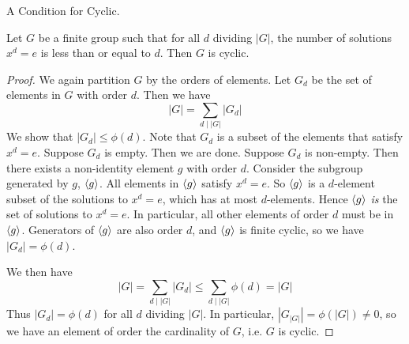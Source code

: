 \documentclass[../../book.tex]{subfiles}
\begin{document}
\begin{thm} A Condition for Cyclic.
    
    Let $G$ be a finite group such that for all $d$ dividing $|G|$, 
    the number of solutions $x^d = e$ is less than or equal to $d$. 
    Then $G$ is cyclic.
\end{thm}
\begin{proof}
    
    We again partition $G$ by the orders of elements. 
    Let $G_d$ be the set of elements in $G$ with order $d$. 
    Then we have \[
        |G| = \sum_{d \mid |G|} |G_d|
    \]
    We show that $|G_d| \leq \phi(d)$. 
    Note that $G_d$ is a subset of the elements that satisfy $x^d = e$. 
    Suppose $G_d$ is empty. Then we are done.
    Suppose $G_d$ is non-empty. 
    Then there exists a non-identity element $g$ with order $d$.
    Consider the subgroup generated by $g$, $\langle g\rangle$. 
    All elements in $\langle g\rangle$ satisfy $x^d = e$.
    So $\langle g\rangle$ is a $d$-element subset of the solutions to $x^d = e$,
    which has at most $d$-elements.
    Hence $\langle g\rangle$ \emph{is} the set of solutions to $x^d = e$.
    In particular, all other elements of order $d$ must be in $\langle g\rangle$.
    Generators of $\langle g\rangle$ are also order $d$, 
    and $\langle g\rangle$ is finite cyclic, so we have $|G_d| = \phi(d)$. 
    
    We then have \[
        |G| = \sum_{d \mid |G|} |G_d| \leq \sum_{d \mid |G|} \phi(d) = |G|
    \]
    Thus $|G_d| = \phi(d)$ for all $d$ dividing $|G|$. 
    In particular, $|G_{|G|}| = \phi(|G|) \neq 0$, 
    so we have an element of order the cardinality of $G$,
    i.e. $G$ is cyclic.
\end{proof}
\end{document}
